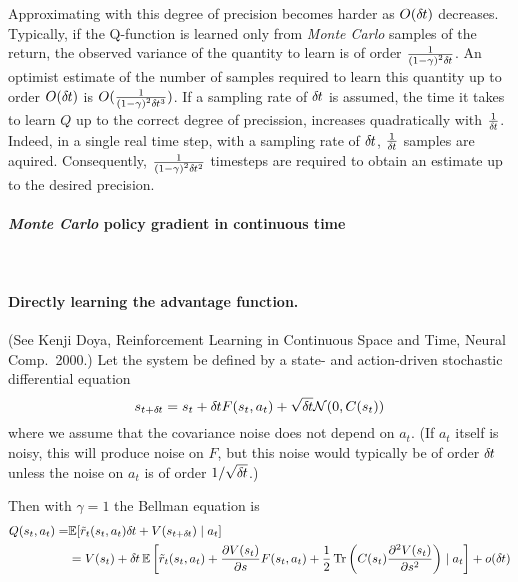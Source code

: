 Approximating with this degree of precision becomes harder as $O (\delta\hspace{-.06em}t)$
decreases. Typically, if the Q-function is learned only from \emph{Monte Carlo} samples
of the return, the observed variance of the quantity to learn is of order
$\frac{1}{{(1 - \gamma)} ^ 2 \delta\hspace{-.06em}t}$. An optimist estimate of the number of
samples required to learn this quantity up to order $O (\delta\hspace{-.06em}t)$ is 
$O (\frac{1}{{(1 - \gamma)}^2 \delta\hspace{-.06em}t^3})$. If a sampling rate of $\delta\hspace{-.06em}t$ is
assumed, the time it takes to learn $Q$ up to the correct degree of precission,
increases quadratically with $\frac{1}{\delta\hspace{-.06em}t}$. Indeed, in a single real time step, with a
sampling rate of $\delta\hspace{-.06em}t$, $\frac{1}{\delta\hspace{-.06em}t}$ samples are aquired. Consequently,
$\frac{1}{{(1 - \gamma)}^2 \delta\hspace{-.06em}t^2}$ timesteps are required to obtain an estimate up
to the desired precision.

\paragraph{\emph{Monte Carlo} policy gradient in continuous time}~\\

\paragraph{Directly learning the advantage function.}
(See Kenji Doya, Reinforcement Learning in Continuous Space and Time,
Neural Comp.\ 2000.)
Let the system be defined by a state- and action-driven stochastic
differential equation
\begin{equation}
s_{t+\delta\hspace{-.06em}t}=s_t+\delta\hspace{-.06em}t F(s_t,a_t)+\sqrt{\delta\hspace{-.06em}t}\mathcal{N}(0,C(s_t))
\end{equation}
where we assume that the covariance noise does not depend on $a_t$. (If
$a_t$ itself is noisy, this will produce noise on $F$, but this noise
would typically be of order $\delta\hspace{-.06em}t$ unless the noise on $a_t$ is of
order $1/\sqrt{\delta\hspace{-.06em}t}$.)

Then with $\gamma=1$ the Bellman equation is
\begin{align}
Q(s_t,a_t)=&\mathbb{E}[ \tilde{r}_t(s_t,a_t) \delta\hspace{-.06em}t + V(s_{t+\delta\hspace{-.06em}t}) \mid a_t]
\\&=V(s_t)+\delta\hspace{-.06em}t \,\mathbb{E}\left[\tilde{r}_t(s_t,a_t)+\frac{\partial V(s_t)}{\partial
s}F(s_t,a_t)+\frac12 \operatorname{Tr} \left(C(s_t)\frac{\partial^2 V(s_t)}{\partial
s^2}\right)\mid a_t\right]+o(\delta\hspace{-.06em}t)
\end{align}

